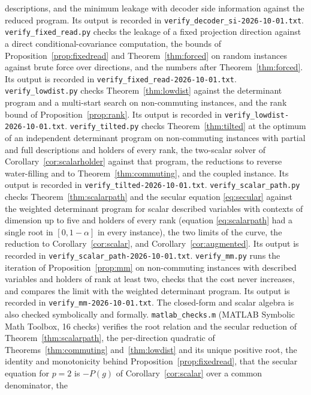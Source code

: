 \documentclass[11pt,onecolumn]{IEEEtran}
\begin{document}
descriptions, and the minimum leakage with decoder side information
against the reduced program. Its output is recorded in
\texttt{verify\_decoder\_si-2026-10-01.txt}. \texttt{verify\_fixed\_read.py}
checks the leakage of a fixed projection direction against a direct conditional-covariance
computation, the bounds of Proposition~\ref{prop:fixedread} and
Theorem~\ref{thm:forced} on random instances against brute force over
directions, and the numbers after Theorem~\ref{thm:forced}. Its output is
recorded in \texttt{verify\_fixed\_read-2026-10-01.txt}.
\texttt{verify\_lowdist.py} checks Theorem~\ref{thm:lowdist} against the
determinant program and a multi-start search on non-commuting instances,
and the rank bound of Proposition~\ref{prop:rank}. Its output is recorded in
\texttt{verify\_lowdist-2026-10-01.txt}. \texttt{verify\_tilted.py}
checks Theorem~\ref{thm:tilted} at the optimum of an independent
determinant program on non-commuting instances with partial and full
descriptions and holders of every rank, the two-scalar solver of
Corollary~\ref{cor:scalarholder} against that program, the reductions to
reverse water-filling and to Theorem~\ref{thm:commuting}, and the coupled
instance. Its output is recorded in
\texttt{verify\_tilted-2026-10-01.txt}. \texttt{verify\_scalar\_path.py}
checks Theorem~\ref{thm:scalarpath} and the secular equation
\eqref{eq:secular} against the weighted determinant program for scalar
described variables with contexts of dimension up to five and holders of
every rank (equation \eqref{eq:scalarpath} had a single root in $[0,1-\alpha]$
in every instance), the two limits of the curve, the reduction to
Corollary~\ref{cor:scalar}, and Corollary~\ref{cor:augmented}. Its output is
recorded in \texttt{verify\_scalar\_path-2026-10-01.txt}.
\texttt{verify\_mm.py} runs the iteration of Proposition~\ref{prop:mm} on
non-commuting instances with described variables and holders of rank at
least two, checks that the cost never increases, and compares the limit
with the weighted determinant program. Its output is recorded in
\texttt{verify\_mm-2026-10-01.txt}. The closed-form and scalar algebra is
also checked symbolically and formally. \texttt{matlab\_checks.m} (MATLAB
Symbolic Math Toolbox, 16 checks) verifies the root relation and the
secular reduction of Theorem~\ref{thm:scalarpath}, the per-direction
quadratic of Theorems~\ref{thm:commuting} and~\ref{thm:lowdist} and its
unique positive root, the identity and monotonicity behind
Proposition~\ref{prop:fixedread}, that the secular equation for $p=2$ is
$-P(g)$ of Corollary~\ref{cor:scalar} over a common denominator, the
\end{document}
